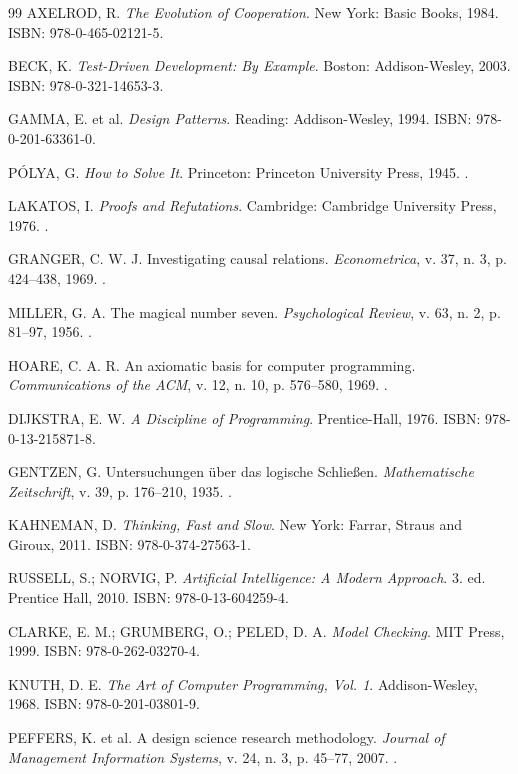\begin{thebibliography}{99}
AXELROD, R. \textit{The Evolution of Cooperation}. New York: Basic Books, 1984. ISBN: 978-0-465-02121-5.

BECK, K. \textit{Test-Driven Development: By Example}. Boston: Addison-Wesley, 2003. ISBN: 978-0-321-14653-3.

GAMMA, E. et al. \textit{Design Patterns}. Reading: Addison-Wesley, 1994. ISBN: 978-0-201-63361-0.

PÓLYA, G. \textit{How to Solve It}. Princeton: Princeton University Press, 1945. .

LAKATOS, I. \textit{Proofs and Refutations}. Cambridge: Cambridge University Press, 1976. .

GRANGER, C. W. J. Investigating causal relations. \textit{Econometrica}, v. 37, n. 3, p. 424--438, 1969. .

MILLER, G. A. The magical number seven. \textit{Psychological Review}, v. 63, n. 2, p. 81--97, 1956. .

HOARE, C. A. R. An axiomatic basis for computer programming. \textit{Communications of the ACM}, v. 12, n. 10, p. 576--580, 1969. .

DIJKSTRA, E. W. \textit{A Discipline of Programming}. Prentice-Hall, 1976. ISBN: 978-0-13-215871-8.

GENTZEN, G. Untersuchungen über das logische Schließen. \textit{Mathematische Zeitschrift}, v. 39, p. 176--210, 1935. .

KAHNEMAN, D. \textit{Thinking, Fast and Slow}. New York: Farrar, Straus and Giroux, 2011. ISBN: 978-0-374-27563-1.

RUSSELL, S.; NORVIG, P. \textit{Artificial Intelligence: A Modern Approach}. 3. ed. Prentice Hall, 2010. ISBN: 978-0-13-604259-4.

CLARKE, E. M.; GRUMBERG, O.; PELED, D. A. \textit{Model Checking}. MIT Press, 1999. ISBN: 978-0-262-03270-4.

KNUTH, D. E. \textit{The Art of Computer Programming, Vol. 1}. Addison-Wesley, 1968. ISBN: 978-0-201-03801-9.

PEFFERS, K. et al. A design science research methodology. \textit{Journal of Management Information Systems}, v. 24, n. 3, p. 45--77, 2007. .


\end{thebibliography}
